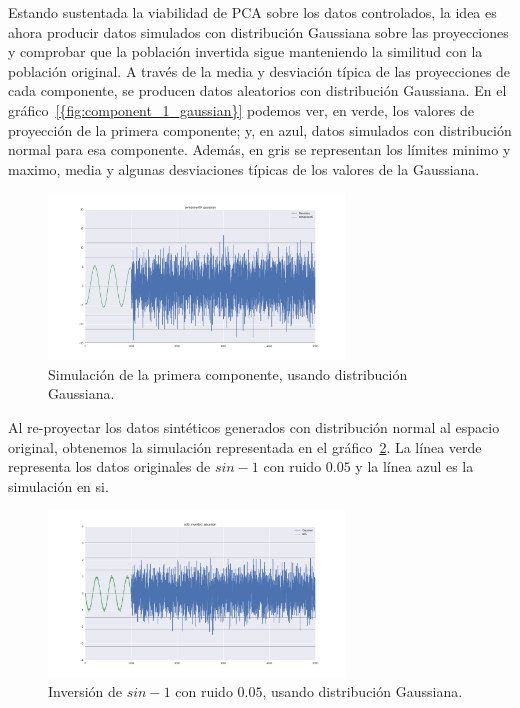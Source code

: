 \documentclass[11pt,spanish,listoffigures,listoftables]{tfgetsinf}
\begin{document}
    Estando sustentada la viabilidad de PCA sobre los datos controlados, la idea es ahora producir datos simulados con distribución Gaussiana sobre las proyecciones y comprobar que la población invertida sigue manteniendo la similitud con la población original. A través de la media y desviación típica de las proyecciones de cada componente, se producen datos aleatorios con distribución Gaussiana. En el gráfico~\ref{{fig:component_1_gaussian}} podemos ver, en verde, los valores de proyección de la primera componente; y, en azul, datos simulados con distribución normal para esa componente. Además, en gris se representan los límites minimo y maximo, media y algunas desviaciones típicas de los valores de la Gaussiana.

    \begin{figure}[H]
        \centering
        \includegraphics[width=0.7\textwidth]{component0_gaussian.png}
        \caption{Simulación de la primera componente, usando distribución Gaussiana.}
        \label{fig:component_1_gaussian}
    \end{figure}
    
    Al re-proyectar los datos sintéticos generados con distribución normal al espacio original, obtenemos la simulación representada en el gráfico~\ref{fig:col5_inverted_gaussian}. La línea verde representa los datos originales de \(sin - 1\) con ruido \(0.05\) y la línea azul es la simulación en si. 
     
    \begin{figure}[H]
        \centering
        \includegraphics[width=0.7\textwidth]{col5_inverted_gaussian}
        \caption{Inversión de \(sin - 1\) con ruido \(0.05\), usando distribución Gaussiana.}
        \label{fig:col5_inverted_gaussian}
    \end{figure}
    
\end{document}
